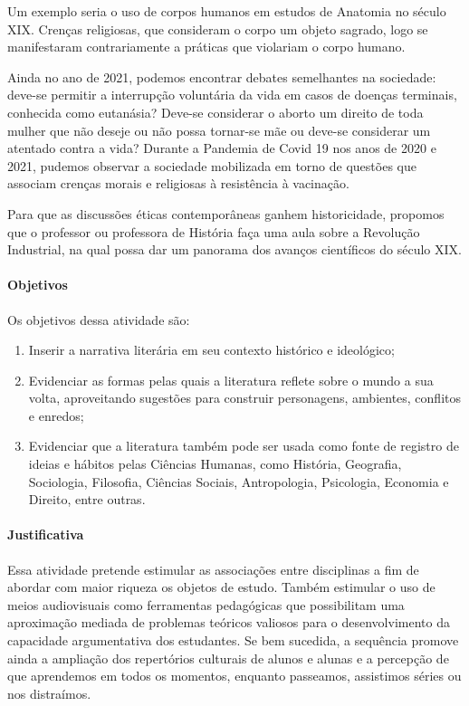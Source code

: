 \documentclass[12pt]{extarticle}
\begin{document}
Um exemplo seria o uso de corpos humanos em estudos de Anatomia no
século XIX. Crenças religiosas, que consideram o corpo um objeto
sagrado, logo se manifestaram contrariamente a práticas que violariam o
corpo humano.

Ainda no ano de 2021, podemos encontrar debates semelhantes na
sociedade: deve-se permitir a interrupção voluntária da vida em casos de
doenças terminais, conhecida como eutanásia? Deve-se considerar o aborto
um direito de toda mulher que não deseje ou não possa tornar-se mãe ou
deve-se considerar um atentado contra a vida? Durante a Pandemia de
Covid 19 nos anos de 2020 e 2021, pudemos observar a sociedade
mobilizada em torno de questões que associam crenças morais e religiosas
à resistência à vacinação.

Para que as discussões éticas contemporâneas ganhem historicidade,
propomos que o professor ou professora de História faça uma aula sobre a
Revolução Industrial, na qual possa dar um panorama dos avanços
científicos do século XIX. 


\paragraph{Objetivos}
Os objetivos dessa atividade são:

\begin{enumerate}
\item
Inserir a narrativa literária em
seu contexto histórico e ideológico; 

\item
Evidenciar as formas pelas quais
a literatura reflete sobre o mundo a sua volta, aproveitando sugestões
para construir personagens, ambientes, conflitos e enredos;

\item
Evidenciar que a literatura também pode ser usada como fonte de registro
de ideias e hábitos pelas Ciências Humanas, como História, Geografia,
Sociologia, Filosofia, Ciências Sociais, Antropologia, Psicologia,
Economia e Direito, entre outras.
\end{enumerate}

\paragraph{Justificativa}
Essa atividade pretende estimular as associações entre disciplinas a fim
de abordar com maior riqueza os objetos de estudo. Também estimular o
uso de meios audiovisuais como ferramentas pedagógicas que possibilitam
uma aproximação mediada de problemas teóricos valiosos para o
desenvolvimento da capacidade argumentativa dos estudantes. Se bem
sucedida, a sequência promove ainda a ampliação dos repertórios
culturais de alunos e alunas e a percepção de que aprendemos em todos os
momentos, enquanto passeamos, assistimos séries ou nos distraímos.
\end{document}
